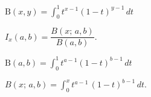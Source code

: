 \documentclass{article}
\begin{document}
$ \mathrm{B}(x,y) = \int_0^1t^{x-1}(1-t)^{y-1}\,dt $
\pagebreak

$ I_x(a,b) = \dfrac{B(x;\,a,b)}{B(a,b)}. $
\pagebreak

$ \mathrm{B}(a,b) = \int_0^1t^{a-1}(1-t)^{b-1}\,dt $
\pagebreak

$ B(x;\,a,b) = \int_0^x t^{a-1}\,(1-t)^{b-1}\,dt. $
\pagebreak
\end{document}
